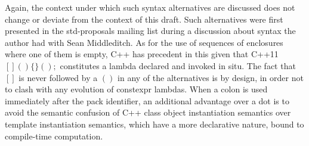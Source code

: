 Again, the context under which such syntax alternatives are discussed does not change or deviate from the context of this draft.
Such alternatives were first presented in the std-proposals mailing list during a discussion about syntax the author had with Sean Middleditch.
As for the use of sequences of enclosures where one of them is empty, C++ has precedent in this given that C++11 $\bm{[]()\{\}();}$ constitutes a lambda declared and invoked in situ.
The fact that $\bm{[]}$ is never followed by a $\bm{()}$ in any of the alternatives is by design, in order not to clash with any evolution of constexpr lambdas.
When a colon is used immediately after the pack identifier, an additional advantage over a dot is to avoid the semantic confusion of C++ class object instantiation semantics over template instantiation semantics, which have a more declarative nature, bound to compile-time computation.
